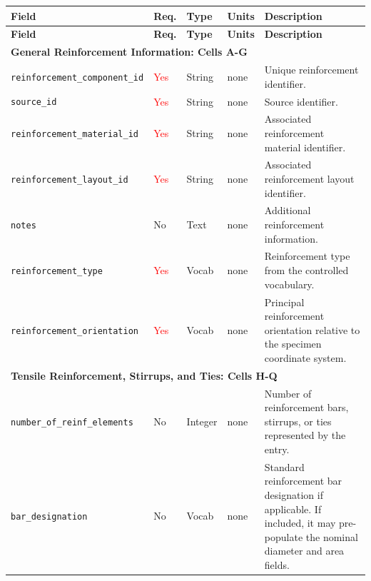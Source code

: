 \documentclass[11pt]{book}
\begin{document}
\begin{longtable}{p{}p{}p{}p{}p{}}

\hline
\textbf{Field} &
\textbf{Req.} &
\textbf{Type} &
\textbf{Units} &
\textbf{Description} \\
\hline
\endfirsthead

\hline
\textbf{Field} &
\textbf{Req.} &
\textbf{Type} &
\textbf{Units} &
\textbf{Description} \\
\hline
\endhead

\multicolumn{5}{l}{\textbf{General Reinforcement Information: Cells A-G}} \\
\hline

\texttt{reinforcement\_component\_id} &
\textcolor{red}{Yes} &
String &
none &
Unique reinforcement identifier. \\

\texttt{source\_id} &
\textcolor{red}{Yes} &
String &
none &
Source identifier. \\

\texttt{reinforcement\_material\_id} &
\textcolor{red}{Yes} &
String &
none &
Associated reinforcement material identifier. \\

\texttt{reinforcement\_layout\_id} &
\textcolor{red}{Yes} &
String &
none &
Associated reinforcement layout identifier. \\

\texttt{notes} &
No &
Text &
none &
Additional reinforcement information. \\

\texttt{reinforcement\_type} &
\textcolor{red}{Yes} &
Vocab &
none &
Reinforcement type from the controlled vocabulary. \\

\texttt{reinforcement\_orientation} &
\textcolor{red}{Yes} &
Vocab &
none &
Principal reinforcement orientation relative to the specimen coordinate system. \\


\hline
\multicolumn{5}{l}{\textbf{Tensile Reinforcement, Stirrups, and Ties: Cells H-Q}} \\
\hline


\texttt{number\_of\_reinf\_elements} &
No &
Integer &
none &
Number of reinforcement bars, stirrups, or ties represented by the entry. \\

\texttt{bar\_designation} &
No &
Vocab &
none &
Standard reinforcement bar designation if applicable. If included, it may pre-populate the nominal diameter and area fields. \\


\end{longtable}
\end{document}
